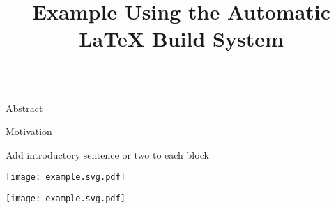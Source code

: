 \documentclass{cbxposter-deep3m}
\title   {Example Using the Automatic LaTeX Build System}
\renewcommand{\smallskip}{\vspace{0.16667in}}
\begin{document}
\begin{frame}[fragile,t]{}
\vspace{0.1in}
\begin{columns}[T]


\begin{column}{10.5in}
\vspace{0.4in}


\begin{block}{Abstract}
  \lipsum[1]
\end{block}


\vspace{0.67in}
\begin{block}{Motivation}
  \centering
  \smallskip

  Add introductory sentence or two to each block

  \begin{minipage}[t]{0.45\tw}
    \vspace{0pt}\centering


    \smallskip\smallskip
    \texttt{[image: example.svg.pdf]}

  \end{minipage}
  \hspace{0.2in}
  \begin{minipage}[t]{0.45\tw}
    \vspace{0pt}\centering


    \smallskip\smallskip
    \texttt{[image: example.svg.pdf]}

  \end{minipage}

  \smallskip\smallskip
\end{block}

\end{column}



\end{columns}
\end{frame}
\end{document}

